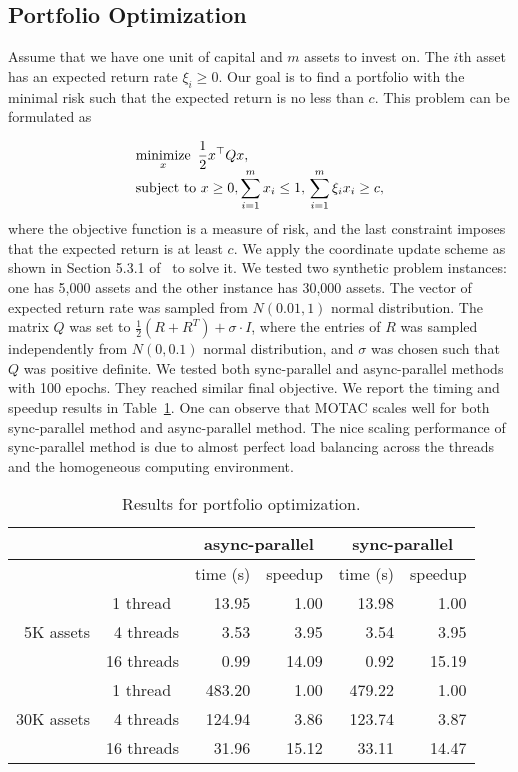 \subsection{Portfolio Optimization}
Assume that we have one unit of capital and $m$ assets to invest on. The $i$th asset has an expected return rate $\xi_i\ge 0$. Our goal is to find a portfolio with the minimal risk such that the expected return is no less than $c$. This problem can be formulated as

\begin{equation*}
\begin{array}{l}
\displaystyle
\operatorname*{minimize}_x ~ \frac{1}{2} x^\top Q x, \\
\displaystyle
\text{subject to}~ x\ge0, \sum_{i=1}^m x_i\le 1,\, \sum_{i=1}^m\xi_i x_i\ge c,
\end{array}
\end{equation*}
where the objective function is a measure of risk, and the last constraint imposes that the expected return is at least $c$. We apply the coordinate update scheme as shown in Section 5.3.1 of~\citep{PengWuXuYanYin2016_coordinate} to solve it.
We tested two synthetic  problem instances: one has 5,000 assets and the other instance has 30,000 assets.
The vector of expected return rate was sampled from $N(0.01, 1)$ normal distribution.
The matrix $Q$ was set to $\frac{1}{2} (R + R^T) + \sigma \cdot I$, where the entries of $R$ was sampled independently from $N(0, 0.1)$ normal distribution, and $\sigma$ was chosen such that $Q$ was positive definite.
We tested both sync-parallel and async-parallel methods with 100 epochs. They reached similar final objective. We report the timing and speedup results in Table~\ref{tab:port_opt}. One can observe that  MOTAC scales well for both sync-parallel method and async-parallel method. The nice scaling performance of sync-parallel method is due to almost perfect load balancing across the threads and the homogeneous computing environment.
\begin{table}[!hb]
\centering
\begin{tabular}{rrrrrr}
\toprule
\multirow{2}{*}{} & &  \multicolumn{2}{c}{async-parallel} & \multicolumn{2}{c}{sync-parallel} \\
\midrule
 & & time (s) & speedup & time (s) & speedup \\
 \midrule
 \multirow{3}{*}{5K assets} & 1 thread~ & 13.95& 1.00 & 13.98& 1.00 \\
  & 4 threads & 3.53& 3.95 &3.54 & 3.95\\
 & 16 threads & 0.99 &14.09 &0.92 & 15.19\\
\midrule
 \multirow{3}{*}{30K assets} & 1 thread~ & 483.20& 1.00& 479.22& 1.00 \\
  & 4 threads & 124.94& 3.86 &123.74 & 3.87\\
 & 16 threads & 31.96 &15.12 &33.11 & 14.47\\
\bottomrule
\end{tabular}
 \caption{\label{tab:port_opt}Results for portfolio optimization. }
\end{table}

